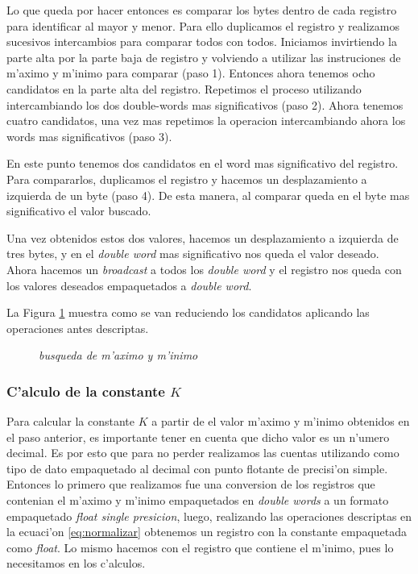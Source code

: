 Lo que queda por hacer entonces es comparar los bytes dentro de cada registro para identificar al mayor y menor. Para ello duplicamos el registro y realizamos sucesivos intercambios para comparar todos con todos. Iniciamos invirtiendo la parte alta por la parte baja de registro y volviendo a utilizar las instruciones de m'aximo y m'inimo para comparar (paso 1). Entonces ahora tenemos ocho candidatos en la parte alta del registro. Repetimos el proceso utilizando intercambiando los dos double-words mas significativos (paso 2). Ahora tenemos cuatro candidatos, una vez mas repetimos la operacion intercambiando ahora los words mas significativos (paso 3).

En este punto tenemos dos candidatos en el word mas significativo del registro. Para compararlos, duplicamos el registro y hacemos un desplazamiento a izquierda de un byte (paso 4). De esta manera, al comparar queda en el byte mas significativo el valor buscado. 

Una vez obtenidos estos dos valores, hacemos un desplazamiento a izquierda de tres bytes, y en el \textit{double word} mas significativo nos queda el valor deseado. Ahora hacemos un \textit{broadcast} a todos los \textit{double word} y el registro nos queda con los valores deseados empaquetados a \textit{double word}.

La Figura \ref{est:normalizar-1} muestra como se van reduciendo los candidatos aplicando las operaciones antes descriptas.

\begin{figure}[ht]
\caption{\textit{busqueda de m'aximo y m'inimo}}
\label{est:normalizar-1}
\end{figure}


\subsubsection*{C'alculo de la constante $K$}

Para calcular la constante $K$ a partir de el valor m'aximo y m'inimo obtenidos en el paso anterior, es importante tener en cuenta que dicho valor es un n'umero decimal. Es por esto que para no perder realizamos las cuentas utilizando como tipo de dato empaquetado al decimal con punto flotante de precisi'on simple. Entonces lo primero que realizamos fue una conversion de los registros que contenian el m'aximo y m'inimo empaquetados en \textit{double words} a un formato empaquetado \textit{float single presicion}, luego, realizando las operaciones descriptas en la ecuaci'on \ref{eq:normalizar} obtenemos un registro con la constante empaquetada como \textit{float}. Lo mismo hacemos con el registro que contiene el m'inimo, pues lo necesitamos en los c'alculos.


